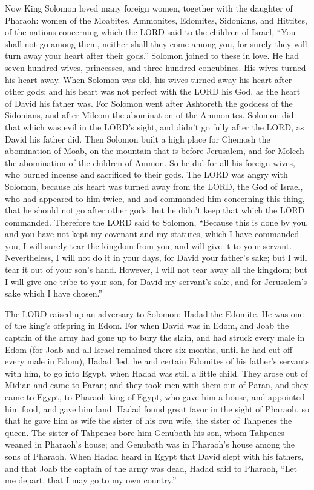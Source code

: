 \mychapter{} \myverse*{}Now King Solomon loved many foreign women, together with the daughter
of Pharaoh: women of the Moabites, Ammonites, Edomites, Sidonians, and Hittites,
\myverse{}of the nations concerning which the LORD said to the children of Israel, “You
shall not go among them, neither shall they come among you, for surely they will turn away your heart
after their gods.” Solomon joined to these in love.
\myverse{}He had seven hundred wives, princesses, and three hundred concubines. His wives
turned his heart away.
\myverse{}When Solomon was old, his wives turned away his heart after other gods; and
his heart was not perfect with the LORD his God, as the heart of David his father was.
\myverse{}For Solomon went after Ashtoreth the goddess of the Sidonians, and after Milcom
the abomination of the Ammonites.
\myverse{}Solomon did that which was evil in the LORD’s sight, and didn’t go fully after
the LORD, as David his father did.
\myverse{}Then Solomon built a high place for Chemosh the abomination of Moab, on the
mountain that is before Jerusalem, and for Molech the abomination of the children of Ammon.
\myverse{}So he did for all his foreign wives, who burned incense and sacrificed to their
gods.
\myverse{}The LORD was angry with Solomon, because his heart was turned away from the
LORD, the God of Israel, who had appeared to him twice,
\myverse{}and had commanded him concerning this thing, that he should not go after
other gods; but he didn’t keep that which the LORD commanded.
\myverse{}Therefore the LORD said to Solomon, “Because this is done by you, and you
have not kept my covenant and my statutes, which I have commanded you, I will surely tear the kingdom
from you, and will give it to your servant.
\myverse{}Nevertheless, I will not do it in your days, for David your father’s sake;
but I will tear it out of your son’s hand.
\myverse{}However, I will not tear away all the kingdom; but I will give one tribe
to your son, for David my servant’s sake, and for Jerusalem’s sake which I have chosen.”

\myverse{}The LORD raised up an adversary to Solomon: Hadad the Edomite.
He was one of the king’s offspring in Edom.
\myverse{}For when David was in Edom, and Joab the captain of the army had gone up
to bury the slain, and had struck every male in Edom
\myverse{}(for Joab and all Israel remained there six months, until he had cut off
every male in Edom),
\myverse{}Hadad fled, he and certain Edomites of his father’s servants with him, to
go into Egypt, when Hadad was still a little child.
\myverse{}They arose out of Midian and came to Paran; and they took men with them out
of Paran, and they came to Egypt, to Pharaoh king of Egypt, who gave him a house, and appointed him food,
and gave him land.
\myverse{}Hadad found great favor in the sight of Pharaoh, so that he gave him as wife
the sister of his own wife, the sister of Tahpenes the queen.
\myverse{}The sister of Tahpenes bore him Genubath his son, whom Tahpenes weaned in
Pharaoh’s house; and Genubath was in Pharaoh’s house among the sons of Pharaoh.
\myverse{}When Hadad heard in Egypt that David slept with his fathers, and that Joab
the captain of the army was dead, Hadad said to Pharaoh, “Let me depart, that I may go to my own country.”

